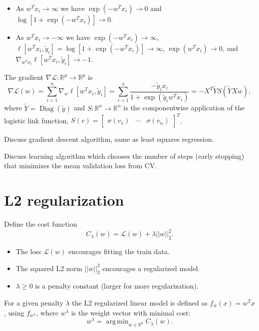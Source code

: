 \documentclass{article}
\DeclareMathOperator*{\argmin}{arg\,min}
\DeclareMathOperator*{\Diag}{Diag}
\begin{document}
\begin{itemize}
\item As $w^T x_i\rightarrow \infty$ we have
  $\exp(-w^T x_i)\rightarrow 0$ and
  $\log [1+\exp(- w^T x_i)]\rightarrow 0$.
\item As $w^T x_i\rightarrow -\infty$ we have
  $\exp(-w^T x_i)\rightarrow \infty$,
  $\ell[w^T x_i, \tilde y_i] = \log [1+\exp(- w^T x_i)]\rightarrow \infty$,
  $\exp(w^T x_i)\rightarrow 0$, and $\nabla_{w^T x_i} \ell[w^T x_i, \tilde y_i] \rightarrow -1$.
\end{itemize}


The gradient $\nabla\mathcal L:\mathbb R^p\rightarrow\mathbb R^p$ is
\begin{equation*}
\nabla \mathcal L(w) = \sum_{i=1}^n \nabla_w \ell[w^T x_i, \tilde y_i] = 
\sum_{i=1}^n \frac{
  -\tilde y_i x_i
}{
  1+\exp(\tilde y_i w^T x_i)
} = -X^T \tilde Y S(\tilde Y X w),
\end{equation*}
where $\tilde Y=\Diag(\tilde y)$ and $S:\mathbb R^n\rightarrow \mathbb R^n$ is the componentwise application
of the logistic link function,
$S(v) = \left[
    \begin{array}{ccc}
      \sigma(v_1) & \cdots & \sigma(v_n)
    \end{array}
\right]^T$.

Discuss gradient descent algorithm, same as least squares regression.

Discuss learning algorithm which chooses the number of steps (early
stopping) that minimizes the mean validation loss from CV.

\section{L2 regularization}

Define the cost function
\begin{equation}
  \label{eq:cost}
  C_\lambda(w) = \mathcal L(w) + \lambda||w||_2^2.
\end{equation}
\begin{itemize}
\item The loss $\mathcal L(w)$  encourages fitting the train data.
\item The squared L2 norm $||w||_2^2$ encourages a regularized model.
\item $\lambda\geq 0$ is a penalty constant (larger for more regularization).
\end{itemize}

For a given penalty $\lambda$ the L2 regularized linear model is
defined as $f_w(x)= w^T x$, using $f_{w^\lambda}$, where $w^\lambda$ is the
weight vector with minimal cost:
\begin{equation}
  w^\lambda = \argmin_{w\in\mathbb R^p} C_\lambda(w).
\end{equation}
\end{document}
